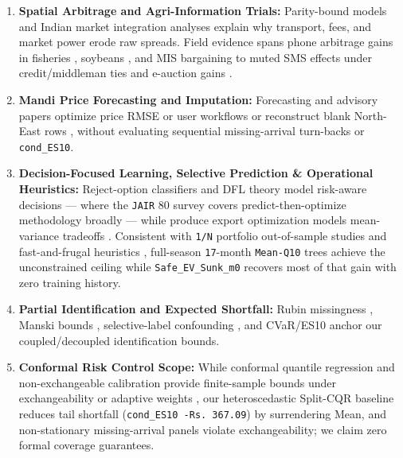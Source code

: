 \documentclass[11pt,a4paper]{article}
\begin{document}
\begin{enumerate}
  \item \textbf{Spatial Arbitrage and Agri-Information Trials:} Parity-bound models \citep{baulch1997transfer} and Indian market integration analyses \citep{sekhar2012agricultural,chatterjee2016six,negi2018farmers,mahajan2021covid,chatterjee2023market} explain why transport, fees, and market power erode raw spreads. Field evidence spans phone arbitrage gains in fisheries \citep{jensen2007digital}, soybeans \citep{goyal2010information}, and MIS bargaining \citep{courtois2015farmer} to muted SMS effects under credit/middleman ties \citep{fafchamps2012sms,mitra2018asymmetric} and e-auction gains \citep{levi2020impact,levi2025improving}.
  \item \textbf{Mandi Price Forecasting and Imputation:} Forecasting and advisory papers optimize price RMSE or user workflows \citep{madaan2019price,ma2019price,guo2020mandi,ziegler2019fresh,ladhar2023ai,biradar2026agrimarket,manimegalai2026mandicast} or reconstruct blank North-East rows \citep{deka2026missing}, without evaluating sequential missing-arrival turn-backs or \texttt{cond\_ES10}.
  \item \textbf{Decision-Focused Learning, Selective Prediction \& Operational Heuristics:} Reject-option classifiers and DFL theory model risk-aware decisions \citep{chow1970optimum,el_yaniv2010selective,geifman2017selective,ban2019bigdata,elmachtoub2022smart,franc2023optimal,mandi2024dfl} --- where the \texttt{JAIR} 80 survey covers predict-then-optimize methodology broadly --- while produce export optimization models mean-variance tradeoffs \citep{vargas2026mean}. Consistent with \texttt{1/N} portfolio out-of-sample studies \citep{demiguel2009optimal} and fast-and-frugal heuristics \citep{gigerenzer2011heuristic}, full-season \texttt{17}-month \texttt{Mean-Q10} trees achieve the unconstrained ceiling while \texttt{Safe\_EV\_Sunk\_m0} recovers most of that gain with zero training history.
  \item \textbf{Partial Identification and Expected Shortfall:} Rubin missingness \citep{rubin1976inference}, Manski bounds \citep{manski1990bounds,horowitz2000nonparametric}, selective-label confounding \citep{lakkaraju2017selective,kallus2021minimax}, and CVaR/ES10 \citep{rockafellar2000cvar} anchor our coupled/decoupled identification bounds.
  \item \textbf{Conformal Risk Control Scope:} While conformal quantile regression and non-exchangeable calibration provide finite-sample bounds under exchangeability or adaptive weights \citep{lei2018distribution,romano2019conformalized,gibbs2021adaptive,angelopoulos2023conformal,barber2023beyond,jin2023selection,angelopoulos2024conformal,lekeufack2024conformal}, our heteroscedastic Split-CQR baseline reduces tail shortfall (\texttt{cond\_ES10 -Rs.\,367.09}) by surrendering Mean, and non-stationary missing-arrival panels violate exchangeability; we claim zero formal coverage guarantees.
\end{enumerate}
\end{document}

